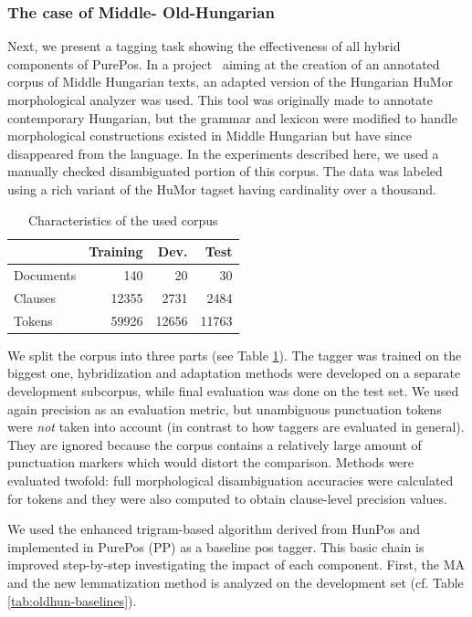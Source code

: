 \subsubsection{The case of Middle- Old-Hungarian}
\label{sec:oldhungarian}

Next, we present a tagging task showing the effectiveness of all hybrid components of PurePos. 
In a project~\cite{Novak2013} aiming at the creation of an annotated corpus of Middle Hungarian texts, an adapted version of the Hungarian HuMor morphological analyzer was used. 
This tool was originally made to annotate contemporary Hungarian, but the grammar and lexicon were modified to handle morphological constructions existed in Middle Hungarian but have since disappeared from the language. 
In the experiments described here, we used a manually checked disambiguated portion of this corpus. The data was labeled using a rich variant of the HuMor tagset having cardinality over a thousand.

\begin{table}[ht]
\centering
\caption{Characteristics of the used corpus}\label{tab:oldhun-corpus}
\begin{tabular}{l r r r}
\hline
& Training & Dev. & Test \\
\hline
Documents & 140 & 20 & 30 \\
Clauses & 12355 & 2731 & 2484 \\
Tokens & 59926 & 12656 &  11763\\
\hline
\end{tabular}
\end{table}

We split the corpus into three parts (see Table \ref{tab:oldhun-corpus}). 
The tagger was trained on the biggest one, hybridization and adaptation methods were developed on a separate development subcorpus, while final evaluation was done on the test set.
We used again precision as an evaluation metric, but unambiguous punctuation tokens were \emph{not} taken into account (in contrast to how taggers are evaluated in general). 
They are ignored because the corpus contains a relatively large amount of punctuation markers which would distort the comparison.
Methods were evaluated twofold: full morphological disambiguation accuracies were calculated for tokens and they were also computed to obtain clause-level precision values.

We used the enhanced trigram-based algorithm derived from HunPos and implemented in PurePos (PP) as a baseline \gls{pos} tagger. 
This basic chain is improved step-by-step investigating the impact of each component.
First, the MA and the new lemmatization method is analyzed on the development set (cf. Table \ref{tab:oldhun-baselines}). 


